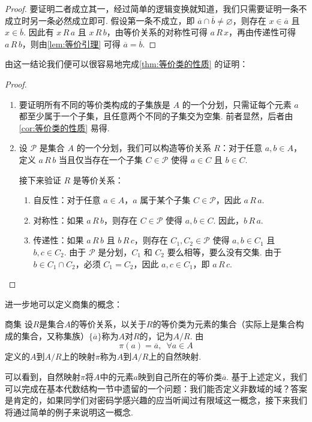 \begin{proof}
    要证明二者成立其一，经过简单的逻辑变换就知道，我们只需要证明一条不成立时另一条必然成立即可. 假设第一条不成立，即 $\overline{a}\cap\overline{b}\neq\varnothing$，则存在 $x \in \overline{a}$ 且 $x \in \overline{b}$. 因此有 $x \,R\, a$ 且 $x \,R\, b$，由等价关系的对称性可得 $a \,R\, x$，再由传递性可得 $a \,R\, b$，则由\autoref{lem:等价引理} 可得 $\overline{a}=\overline{b}$.
\end{proof}

由这一结论我们便可以很容易地完成\autoref{thm:等价类的性质} 的证明：

\begin{proof}
\begin{enumerate}
    \item 要证明所有不同的等价类构成的子集族是 $A$ 的一个分划，只需证每个元素 $a$ 都至少属于一个子集，且任意两个不同的子集交为空集. 前者显然，后者由\autoref{cor:等价类的性质} 易得.
    \item 设 $ \mathcal{P} $ 是集合 $ A $ 的一个分划，我们可以构造等价关系 $ R $：对于任意 $ a, b \in A $，定义 $ a \,R\, b $ 当且仅当存在一个子集 $ C \in \mathcal{P} $ 使得 $ a \in C $ 且 $ b \in C $.

    接下来验证 $R$ 是等价关系：
    \begin{enumerate}
        \item 自反性：对于任意 $ a \in A $，$ a $ 属于某个子集 $ C \in \mathcal{P} $，因此 $ a \,R\, a $.
        \item 对称性：如果 $ a \,R\, b $，则存在 $ C \in \mathcal{P} $ 使得 $ a, b \in C $. 因此，$ b \,R\, a $.
        \item 传递性：如果 $ a \,R\, b $ 且 $ b \,R\, c $，则存在 $ C_1, C_2 \in \mathcal{P} $ 使得 $ a, b \in C_1 $ 且 $ b, c \in C_2 $. 由于 $ \mathcal{P} $ 是分划，$ C_1 $ 和 $ C_2 $ 要么相等，要么没有交集. 由于 $ b \in C_1 \cap C_2 $，必须 $ C_1 = C_2 $，因此 $ a, c \in C_1 $，即 $ a \,R\, c $.
    \end{enumerate}
\end{enumerate}
\end{proof}

进一步地可以定义商集的概念：
\begin{definition}{商集}{} 
    设$R$是集合$A$的等价关系，以关于$R$的等价类为元素的集合（实际上是集合构成的集合，又称集族）$\{\overline{a}\}$称为$A$对$R$的，记为$A/R$. 由
    \[\pi(a) = \overline{a}, \enspace \forall a\in A\]
    定义的$A$到$A/R$上的映射$\pi$称为$A$到$A/R$上的自然映射.
\end{definition}
可以看到，自然映射$\pi$将$A$中的元素$a$映到自己所在的等价类$\overline{a}$. 基于上述定义，我们可以完成在基本代数结构一节中遗留的一个问题：我们能否定义非数域的域？答案是肯定的，如果同学们对密码学感兴趣的应当听闻过有限域这一概念，接下来我们将通过简单的例子来说明这一概念.

